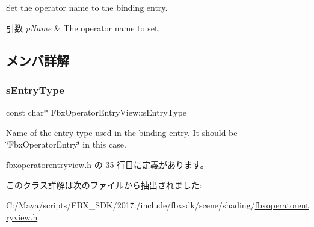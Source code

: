 Set the operator name to the binding entry. 
\begin{DoxyParams}{引数}
{\em p\+Name} & The operator name to set. \\
\hline
\end{DoxyParams}


\subsection{メンバ詳解}
\mbox{\label{class_fbx_operator_entry_view_aff3745ef35e5025550d54e7c2343ea95}} 
\subsubsection{\texorpdfstring{s\+Entry\+Type}{sEntryType}}
{\footnotesize\ttfamily const char$\ast$ Fbx\+Operator\+Entry\+View\+::s\+Entry\+Type\hspace{0.3cm}{\ttfamily [static]}}

Name of the entry type used in the binding entry. It should be \char`\"{}\+Fbx\+Operator\+Entry\char`\"{} in this case. 

 fbxoperatorentryview.\+h の 35 行目に定義があります。



このクラス詳解は次のファイルから抽出されました\+:\begin{DoxyCompactItemize}
\item 
C\+:/\+Maya/scripts/\+F\+B\+X\+\_\+\+S\+D\+K/2017./include/fbxsdk/scene/shading/\hyperlink{fbxoperatorentryview_8h}{fbxoperatorentryview.\+h}\end{DoxyCompactItemize}
